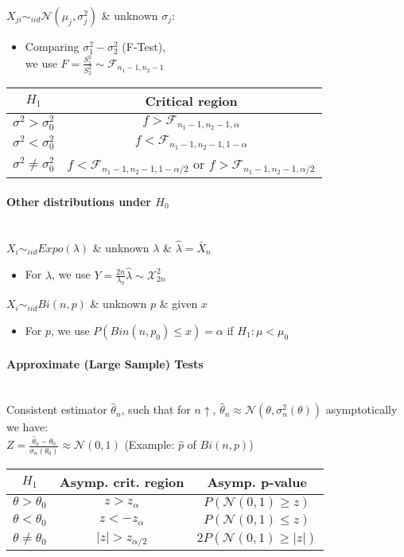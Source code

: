 \documentclass[paper=a4,fontsize=8pt,pagesize,DIV=calc]{scrartcl}
\newcounter{row}
\begin{document}
\begin{multicols}{3}
$X_{ji}\sim_{iid}\mathcal{N}(\mu_j,\sigma_j^2)$ \& unknown $\sigma_j$: 
\begin{itemize}
\item Comparing $\sigma^2_1-\sigma^2_2$ (F-Test), \\we use $F=\frac{S^2_1}{S^2_2}\sim \mathcal{F}_{n_1-1,n_2-1}$
\end{itemize}
\vspace*{-.05\baselineskip}
\begin{tabular}{|c|c|}
\hline
$H_1$&Critical region\\
\hline
$\sigma^2>\sigma^2_0$& $f>\mathcal{F}_{n_1-1,n_2-1,\alpha}$\\
$\sigma^2<\sigma^2_0$ & $f<\mathcal{F}_{n_1-1,n_2-1,1-\alpha}$ \\
$\sigma^2\neq\sigma^2_0$ & $f<\mathcal{F}_{n_1-1,n_2-1,1-\alpha/2}$ or $f>\mathcal{F}_{n_1-1,n_2-1,\alpha/2}$\\
\hline
\end{tabular}
\vspace{0.02cm}

\paragraph{Other distributions under $H_0$}
~~\\
$X_i\sim_{iid}Expo(\lambda)$ \& unknown $\lambda$ \& $\hat{\lambda}=\bar{X}_n$
\begin{itemize}
\item For $\lambda$, we use $Y=\frac{2n}{\lambda_0}\hat{\lambda}\sim\mathcal{X}^2_{2n}$
\end{itemize}
$X_i\sim_{iid} Bi(n,p)$ \& unknown $p$ \& given $x$ 
\begin{itemize}
\item For $p$, we use $P(Bin(n,p_0)\leq x)=\alpha$ if $H_1:\mu<\mu_0$
\end{itemize}

\paragraph{Approximate (Large Sample) Tests}~~\\
Consistent estimator $\hat{\theta}_n$, such that for $n \uparrow$, $\hat{\theta}_n\approx\mathcal{N}(\theta,\sigma^2_n(\theta))$ asymptotically we have: \\$Z=\frac{\hat{\theta}_n-\theta_0}{\sigma_n(\theta_0)}\approx \mathcal{N}(0,1)$ (Example: $\hat{p}$ of $Bi(n,p)$)\\
\begin{tabular}{|c|c|c|}
\hline
$H_1$&Asymp. crit. region& Asymp. p-value\\
\hline
$\theta>\theta_0$& $z>z_{\alpha}$&$P(\mathcal{N}(0,1)\geq z)$\\
$\theta<\theta_0$ & $z<-z_{\alpha}$&$P(\mathcal{N}(0,1)\leq z)$\\
$\theta\neq\theta_0$ & $|z|>z_{\alpha/2}$&$2P(\mathcal{N}(0,1)\geq |z|)$\\
\hline
\end{tabular}
\vspace{0.02cm}


\end{multicols}
\end{document}

